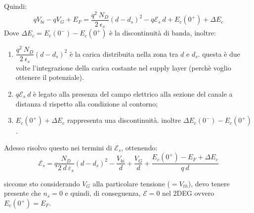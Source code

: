 Quindi:
\begin{equation}
    qV_{bi}-qV_G+E_F=\dfrac{q^2\ N_D}{2\ \epsilon_s}(d-d_s)^2 - q\mathcal{E}_s\ d + E_c(0^+)+\Delta E_c
\end{equation}
Dove $\Delta E_c = E_c(0^-)-E_c(0^+)$ è la discontinuità di banda, inoltre:
\begin{enumerate}
    \item $\dfrac{q^2\ N_D}{2\ \epsilon_s}(d-d_s)^2$ è la carica distribuita nella zona tra $d$ e $d_s$. questa è due volte l'integrazione della carica costante nel supply layer (perchè voglio ottenere il potenziale).
    
    \item $q\mathcal{E}_s\ d$ è legato alla presenza del campo elettrico alla sezione del canale a distanza d rispetto alla condizione al contorno;

    \item $E_c(0^+)+\Delta E_c$ rappresenta una discontinuità. inoltre $\Delta E_c(0^-)-E_c(0^+)$.
\end{enumerate}

Adesso risolvo questo nei termini di $\mathcal{E}_s$, ottenendo:
\begin{equation}
    \mathcal{E}_s=q \dfrac{N_D}{2\ d \ \varepsilon_s}(d-d_s)^2-\dfrac{V_{bi}}{d}+\dfrac{V_G}{d}+\dfrac{E_c(0^+)-E_F+\Delta E_c}{q \ d}
\end{equation}

siccome sto considerando $V_G$ alla particolare tensione ($=V_{th}$), devo tenere presente che $n_s=0$ e quindi, di conseguenza, $\mathcal{E}=0$  nel 2DEG ovvero $E_c(0^+)=E_F$.\\

